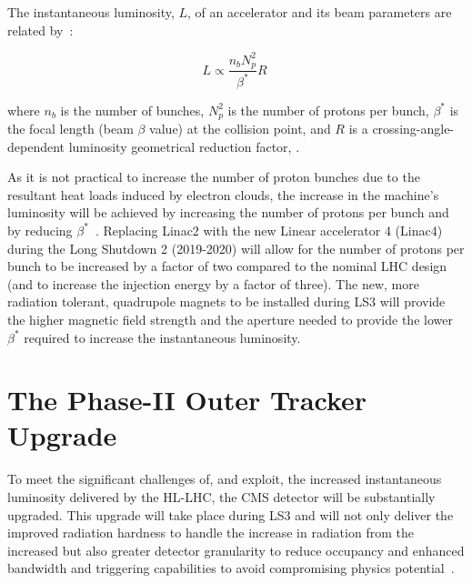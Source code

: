 The instantaneous luminosity, $L$, of an accelerator and its beam parameters are related by~\cite{ApollinariG.:2017ojx}: 

\begin{equation}
L \propto \frac{n_{b}N^{2}_{p}}{\beta^{*}} R  \;
\label{eq:machineLumi}
\end{equation}

where $n_{b}$ is the number of bunches, $N^{2}_{p}$ is the number of protons per bunch, $\beta^{*}$ is the focal length (beam $\beta$ value) at the collision point, and $R$ is a crossing-angle-dependent luminosity geometrical reduction factor, .

As it is not practical to increase the number of proton bunches due to the resultant heat loads induced by electron clouds, the increase in the machine's luminosity will be achieved by increasing the number of protons per bunch and by reducing $\beta^{*}$~\cite{ApollinariG.:2017ojx}.
Replacing Linac2 with the new Linear accelerator 4 (Linac4)~\cite{linac4} during the Long Shutdown 2 (2019-2020) will allow for the number of protons per bunch to be increased by a factor of two compared to the nominal LHC design (and to increase the injection energy by a factor of three).
The new, more radiation tolerant, quadrupole magnets to be installed during LS3 will provide the higher magnetic field strength and the aperture needed to provide the lower $\beta^{*}$ required to increase the instantaneous luminosity. 

\section{The Phase-II Outer Tracker Upgrade}\label{sec:tk-upgrade}
To meet the significant challenges of, and exploit, the increased instantaneous luminosity delivered by the HL-LHC, the CMS detector will be substantially upgraded.
This upgrade will take place during LS3 and will not only deliver the improved radiation hardness to handle the increase in radiation from the increased \PU but also greater detector granularity to reduce occupancy and enhanced bandwidth and triggering capabilities to avoid compromising physics potential~\cite{P2TrackerTDR,CMSCollaboration:2015zni}.

